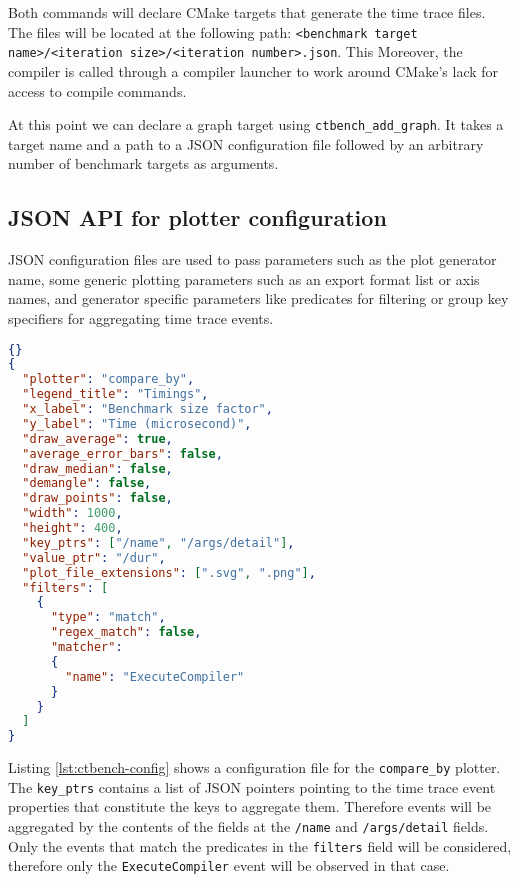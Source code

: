 \documentclass[../main]{subfiles}
\begin{document}
Both commands will declare CMake targets that generate the time trace files.
The files will be located at the following path:
\lstinline{<benchmark target name>/<iteration size>/<iteration number>.json}.
This
Moreover, the compiler is called through a compiler launcher to work around
CMake's lack for access to compile commands.

At this point we can declare a graph target using \lstinline{ctbench_add_graph}.
It takes a target name and a path to a JSON configuration file followed by an
arbitrary number of benchmark targets as arguments.

\subsection{JSON API for plotter configuration}
\label{lbl:ctbench-json-api}

JSON configuration files are used to pass parameters such as the plot generator
name, some generic plotting parameters such as an export format list or axis
names, and generator specific parameters like predicates for filtering or group
key specifiers for aggregating time trace events.

\begin{lstlisting}[language=json,
  caption=ctbench configuration file example,
  label=lst:ctbench-config]{}
{
  "plotter": "compare_by",
  "legend_title": "Timings",
  "x_label": "Benchmark size factor",
  "y_label": "Time (microsecond)",
  "draw_average": true,
  "average_error_bars": false,
  "draw_median": false,
  "demangle": false,
  "draw_points": false,
  "width": 1000,
  "height": 400,
  "key_ptrs": ["/name", "/args/detail"],
  "value_ptr": "/dur",
  "plot_file_extensions": [".svg", ".png"],
  "filters": [
    {
      "type": "match",
      "regex_match": false,
      "matcher":
      {
        "name": "ExecuteCompiler"
      }
    }
  ]
}
\end{lstlisting}

Listing \ref{lst:ctbench-config} shows a configuration file for the
\lstinline{compare_by} plotter. The \lstinline{key_ptrs} contains a list of
JSON pointers pointing to the time trace event properties that constitute the
keys to aggregate them. Therefore events will be aggregated by the contents of
the fields at the \lstinline{/name} and \lstinline{/args/detail} fields.
Only the events that match the predicates in the \lstinline{filters} field will
be considered, therefore only the \lstinline{ExecuteCompiler} event will be
observed in that case.
\end{document}
